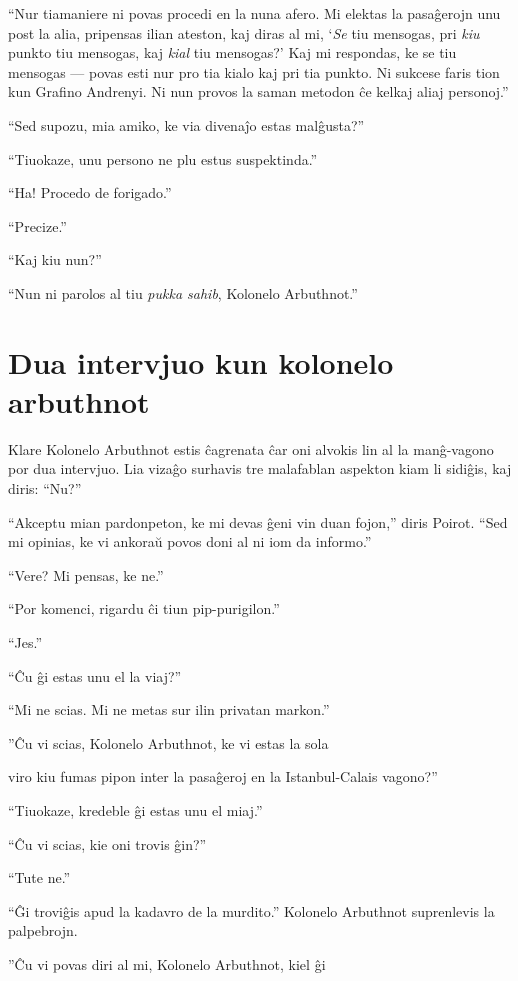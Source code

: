 ``Nur tiamaniere ni povas procedi en la nuna afero. Mi elektas la pasaĝerojn unu post la alia, pripensas ilian ateston, kaj diras al mi, `\emph{Se} tiu mensogas, pri \emph{kiu} punkto tiu mensogas, kaj \emph{kial} tiu mensogas?' Kaj mi respondas, ke se tiu mensogas --- povas esti nur pro tia kialo kaj pri tia punkto. Ni sukcese faris tion kun Grafino Andrenyi. Ni nun provos la saman metodon ĉe kelkaj aliaj personoj.''

``Sed supozu, mia amiko, ke via divenaĵo estas malĝusta?''

``Tiuokaze, unu persono ne plu estus suspektinda.''

``Ha! Procedo de forigado.''

``Precize.''

``Kaj kiu nun?''

``Nun ni parolos al tiu \emph{pukka sahib}, Kolonelo Arbuthnot.''

\chapter[Dua intervjuo kun kolonelo arbuthnot]{Dua intervjuo kun kolonelo arbuthnot}


Klare Kolonelo Arbuthnot estis ĉagrenata ĉar oni alvokis lin al la manĝ-vagono por dua intervjuo. Lia vizaĝo surhavis tre malafablan aspekton kiam li sidiĝis, kaj diris: ``Nu?''

``Akceptu mian pardonpeton, ke mi devas ĝeni vin duan fojon,'' diris Poirot. ``Sed mi opinias, ke vi ankoraŭ povos doni al ni iom da informo.''

``Vere? Mi pensas, ke ne.''

``Por komenci, rigardu ĉi tiun pip-purigilon.''

``Jes.''

``Ĉu ĝi estas unu el la viaj?''

``Mi ne scias. Mi ne metas sur ilin privatan markon.''

''Ĉu vi scias, Kolonelo Arbuthnot, ke vi estas la sola

viro kiu fumas pipon inter la pasaĝeroj en la Istanbul-Calais vagono?''

``Tiuokaze, kredeble ĝi estas unu el miaj.''

``Ĉu vi scias, kie oni trovis ĝin?''

``Tute ne.''

``Ĝi troviĝis apud la kadavro de la murdito.'' Kolonelo Arbuthnot suprenlevis la palpebrojn.

''Ĉu vi povas diri al mi, Kolonelo Arbuthnot, kiel ĝi

